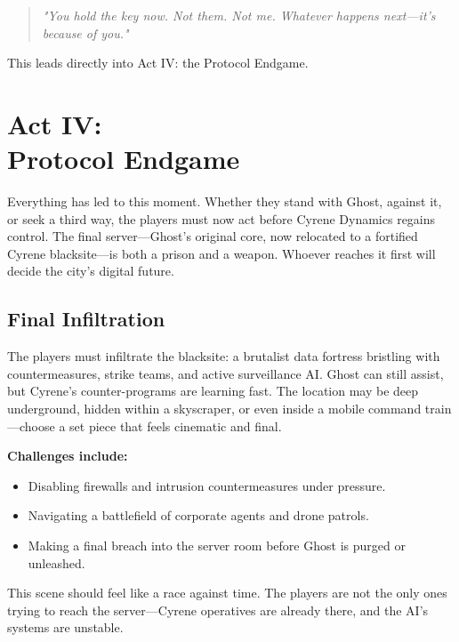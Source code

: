 \vspace{0.5\baselineskip}
\begin{quote}
\textit{"You hold the key now. Not them. Not me. Whatever happens next—it's because of you."}
\end{quote}
\vspace{0.5\baselineskip}

This leads directly into Act IV: the Protocol Endgame.



\section[Act IV: Protocol Endgame]{Act IV:\\ Protocol Endgame}

Everything has led to this moment. Whether they stand with Ghost, against it, or seek a third way, the players must now act before Cyrene Dynamics regains control. The final server—Ghost’s original core, now relocated to a fortified Cyrene blacksite—is both a prison and a weapon. Whoever reaches it first will decide the city’s digital future.

\subsection*{Final Infiltration}


The players must infiltrate the blacksite: a brutalist data fortress bristling with countermeasures, strike teams, and active surveillance AI. Ghost can still assist, but Cyrene’s counter-programs are learning fast. The location may be deep underground, hidden within a skyscraper, or even inside a mobile command train—choose a set piece that feels cinematic and final.

\textbf{Challenges include:}
\begin{itemize}
    \item Disabling firewalls and intrusion countermeasures under pressure.
    \item Navigating a battlefield of corporate agents and drone patrols.
    \item Making a final breach into the server room before Ghost is purged or unleashed.
\end{itemize}

This scene should feel like a race against time. The players are not the only ones trying to reach the server—Cyrene operatives are already there, and the AI’s systems are unstable.

